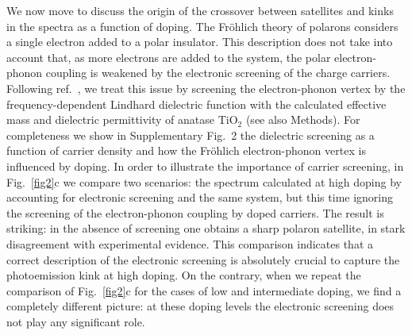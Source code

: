 \documentclass[12pt]{nature}
\begin{document}
We now move to discuss the origin of the crossover between satellites and kinks in the spectra as a 
function of doping. The Fr\"ohlich theory of polarons\cite{Frohlich1954} considers a single electron 
added to a polar insulator. This description does not take into account that, as more electrons are 
added to the system, the polar electron-phonon coupling is weakened by the electronic screening of the 
charge carriers. Following ref.~, we treat this issue by screening the electron-phonon 
vertex by the frequency-dependent Lindhard dielectric function with the calculated effective mass and 
dielectric permittivity of anatase TiO$_2$ (see also Methods). For completeness we show in Supplementary 
Fig.~2 the dielectric screening as a function of carrier density and how the Fr\"ohlich electron-phonon 
vertex is influenced by doping. In order to illustrate the importance of carrier screening, in 
Fig.~\ref{fig2}c we compare two scenarios: the spectrum calculated at high doping by accounting for 
electronic screening and the same system, but this time ignoring the screening 
of the electron-phonon coupling by doped carriers. 
The result is striking: in the absence of screening one obtains a 
sharp polaron satellite, in stark disagreement with experimental evidence. This comparison indicates 
that a correct description of the electronic screening is absolutely crucial to capture the photoemission 
kink at high doping. On the contrary, when we repeat the comparison of Fig.~\ref{fig2}c for the cases of 
low and intermediate doping, we find a completely different picture: at these doping levels the electronic 
screening does not play any significant role. 
\end{document}
